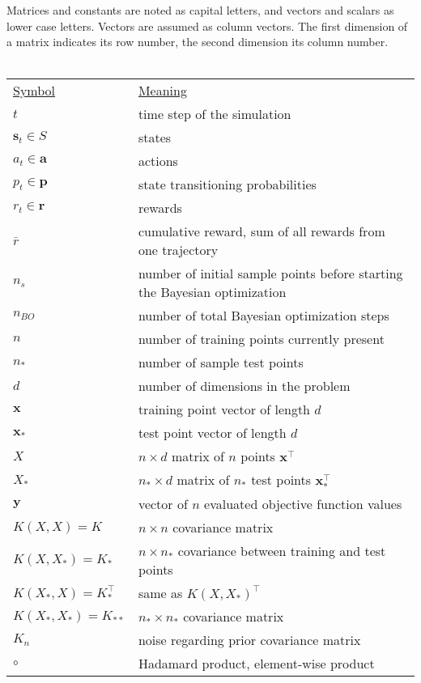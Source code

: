 Matrices and constants are noted as capital letters, and vectors and scalars as lower case letters. Vectors are assumed as column vectors. The first dimension of a matrix indicates its row number, the second dimension its column number.\\
\\
\begin{tabular}{l l}
    \underline{Symbol} & \underline{Meaning}\\
    $t$ & time step of the simulation\\
    $\mathbf{s}_t \in S$ & states\\
    $a_t \in \mathbf{a}$ & actions\\
    $p_t \in \mathbf{p}$ & state transitioning probabilities\\
    $r_t \in \mathbf{r}$ & rewards\\
    $\bar{r}$ & cumulative reward, sum of all rewards from one trajectory\\
    $n_{s}$ & number of initial sample points before starting the Bayesian optimization\\
    $n_{BO}$ & number of total Bayesian optimization steps\\
    $n$ & number of training points currently present\\
    $n_*$ & number of sample test points\\
    $d$ & number of dimensions in the problem\\
    $\mathbf{x}$ & training point vector of length $d$\\
    $\mathbf{x_*}$ & test point vector of length $d$\\
    $X$ & $n \times d$ matrix of $n$ points $\mathbf{x}^{\top}$\\
    $X_*$ & $n_* \times d$ matrix of $n_*$ test points $\mathbf{x}^{\top}_*$\\
    $\mathbf{y}$ & vector of $n$ evaluated objective function values\\
    $K(X,X) = K$ & $n \times n$ covariance matrix\\
    $K(X,X_*) = K_*$ & $n \times n_*$ covariance between training and test points\\
    $K(X_*,X) = K_*^\top$ & same as $K(X,X_*)^{\top}$\\
    $K(X_*,X_*) = K_{**}$ & $n_* \times n_*$ covariance matrix\\
    $K_n$ & noise regarding prior covariance matrix\\
    $\circ$ & Hadamard product, element-wise product\\

\end{tabular}
